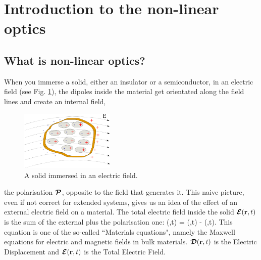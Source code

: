 \section{Introduction to the non-linear optics} 


\subsection{What is non-linear optics?}
When you immerse a solid, either an insulator or a semiconductor, in an electric field (see Fig. \ref{immerse}), the dipoles inside the material get orientated along the field lines and create an internal field, 
\begin{figure}
  \begin{center}
    \includegraphics[width=0.4\textwidth]{Figures/immerse}
  \end{center}
  \caption{A solid immersed in an electric field. \label{immerse}}
\end{figure}
the polarisation ${\boldsymbol {\cal P}}$, opposite to the field that generates it. This naive picture, even if not correct for extended systems, gives us an idea of the effect of an external electric field on a material.
The total electric field inside the solid ${\boldsymbol {\cal E}}({\bf r},t)$ is the sum of the external plus the polarisation one:
\be
\EEc(\rr,t) = \DDc(\rr,t) - \PPc(\rr,t).
\label{materialeq}
\ee
This equation is one of the so-called  ``Materials equations", namely the Maxwell equations for electric and magnetic fields in bulk materials. ${\boldsymbol {\cal D}}({\bf r},t)$ is the Electric Displacement and $ {\boldsymbol {\cal E}}({\bf r},t)$ is the Total Electric Field. %
